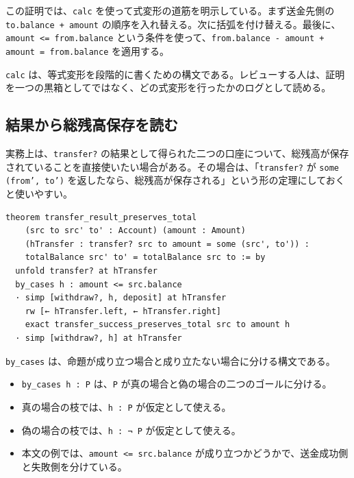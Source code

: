 この証明では、\texttt{calc} を使って式変形の道筋を明示している。まず送金先側の \texttt{to.balance + amount} の順序を入れ替える。次に括弧を付け替える。最後に、\texttt{amount <= from.balance} という条件を使って、\texttt{from.balance - amount + amount = from.balance} を適用する。

\begin{definitionbox}
\texttt{calc} は、等式変形を段階的に書くための構文である。レビューする人は、証明を一つの黒箱としてではなく、どの式変形を行ったかのログとして読める。
\end{definitionbox}


\subsection{結果から総残高保存を読む}

実務上は、\texttt{transfer?} の結果として得られた二つの口座について、総残高が保存されていることを直接使いたい場合がある。その場合は、「\texttt{transfer?} が \texttt{some (from', to')} を返したなら、総残高が保存される」という形の定理にしておくと使いやすい。

\begin{listing}[htbp]
\begin{verbatim}
theorem transfer_result_preserves_total
    (src to src' to' : Account) (amount : Amount)
    (hTransfer : transfer? src to amount = some (src', to')) :
    totalBalance src' to' = totalBalance src to := by
  unfold transfer? at hTransfer
  by_cases h : amount <= src.balance
  · simp [withdraw?, h, deposit] at hTransfer
    rw [← hTransfer.left, ← hTransfer.right]
    exact transfer_success_preserves_total src to amount h
  · simp [withdraw?, h] at hTransfer
\end{verbatim}
\caption{送金結果から総残高保存を取り出す}
\label{lst:ch19-transfer-result-total}
\end{listing}

\begin{syntaxbox}
\texttt{by\_cases} は、命題が成り立つ場合と成り立たない場合に分ける構文である。
\begin{itemize}
\item \texttt{by\_cases h : P} は、\texttt{P} が真の場合と偽の場合の二つのゴールに分ける。
\item 真の場合の枝では、\texttt{h : P} が仮定として使える。
\item 偽の場合の枝では、\texttt{h : ¬ P} が仮定として使える。
\item 本文の例では、\texttt{amount <= src.balance} が成り立つかどうかで、送金成功側と失敗側を分けている。
\end{itemize}
\end{syntaxbox}

